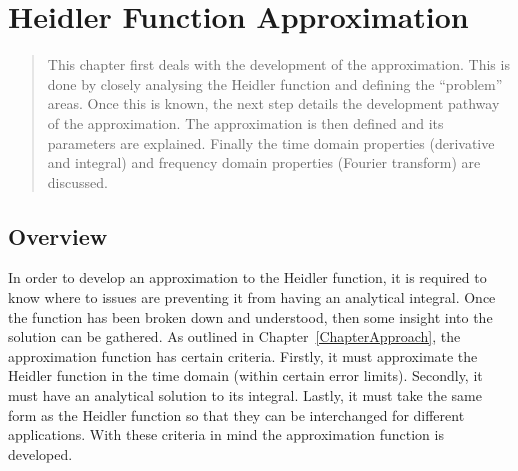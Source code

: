 
\chapter{Heidler Function Approximation} %

\label{ChapterApprox} %

\begin{quote}
This chapter first deals with the development of the approximation. This is done by closely analysing the Heidler function and defining the ``problem'' areas. Once this is known, the next step details the development pathway of the approximation. The approximation is then defined and its parameters are explained. Finally the time domain properties (derivative and integral) and frequency domain properties (Fourier transform) are discussed.
\end{quote}


\section{Overview}
\label{sec:approx_overview}
In order to develop an approximation to the Heidler function, it is required to know where to issues are preventing it from having an analytical integral. Once the function has been broken down and understood, then some insight into the solution can be gathered. As outlined in Chapter~\ref{ChapterApproach}, the approximation function has certain criteria. Firstly, it must approximate the Heidler function in the time domain (within certain error limits). Secondly, it must have an analytical solution to its integral. Lastly, it must take the same form as the Heidler function so that they can be interchanged for different applications. With these criteria in mind the approximation function is developed.


